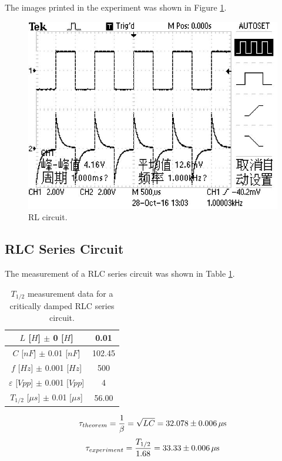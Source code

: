 \documentclass{article}
\begin{document}
The images printed in the experiment was shown in Figure \ref{fig-2}.

\begin{figure}[H]
	\centering
	\includegraphics[scale=0.6]{TEK0003.jpg}
	\caption{RL circuit.}
	\label{fig-2}
\end{figure}

\subsection{RLC Series Circuit}

The measurement of a RLC series circuit was shown in Table \ref{tab-3}.

\begin{table}[!h]
\begin{center}
\begin{tabular}{|c|c|}
\hline
$L$ [$H$] $\pm$ 0 [$H$]	&	0.01	\\
\hline
$C$ [$nF$] $\pm$ 0.01 [$nF$]	&	102.45	\\
\hline
$f$ [$Hz$] $\pm$ 0.001 [$Hz$]	&	500	\\
\hline
$\varepsilon$ [$Vpp$] $\pm$ 0.001 [$Vpp$]	&	4	\\
\hline
$T_{1/2}$ [$\mu s$] $\pm$ 0.01 [$\mu s$]	&	56.00	\\
\hline
\end{tabular}
\caption{$T_{1/2}$ measurement data for a critically damped RLC series circuit.}
\label{tab-3}
\end{center}
\end{table}

$$\tau_{theorem}=\frac{1}{\beta}=\sqrt{LC}=32.078\pm0.006\,\rm{\mu s}$$
$$\tau_{experiment}=\frac{T_{1/2}}{1.68}=33.33\pm0.006\,\rm{\mu s}$$
\end{document}
